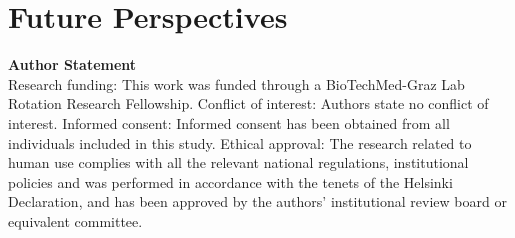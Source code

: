 \documentclass[USenglish,twocolumn]{article}
\begin{document}
  \section{Future Perspectives}

  \vspace{1cm}


  \textsf{\textbf{Author Statement}}\\
  Research funding: This work was funded through a BioTechMed-Graz Lab Rotation Research Fellowship.
  Conflict of interest: Authors state no conflict of interest.
  Informed consent: Informed consent has been obtained from all individuals included in this study.
  Ethical approval: The research related to human use complies with all the relevant national regulations, institutional policies and was performed in accordance with the tenets of the Helsinki Declaration, and has been approved by the authors' institutional review board or equivalent committee.

  \printbibliography
\end{document}
